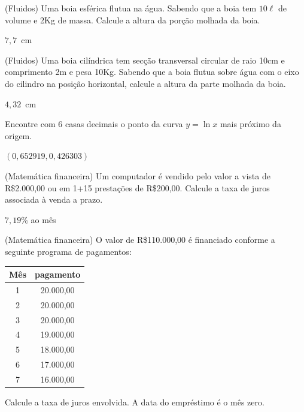 \begin{exer}(Fluidos) \label{boiaesf} Uma boia esférica flutua na água. Sabendo que a boia tem $10\ell$ de volume e 2Kg de massa. Calcule a altura da porção molhada da boia.
\end{exer}
\begin{resp}

$7,7$~cm

\end{resp}

\begin{exer}(Fluidos) \label{boiacil} Uma boia cilíndrica tem secção transversal circular de raio 10cm e comprimento 2m e pesa 10Kg. Sabendo que a boia flutua sobre água com o eixo do cilindro na posição horizontal, calcule a altura da parte molhada da boia.
\end{exer}
\begin{resp}

$4,32$~cm

\end{resp}

\begin{exer} Encontre com 6 casas decimais o ponto da curva $y=\ln x$ mais próximo da origem.
\end{exer}
\begin{resp}

$(0,652919, 0,426303)$

\end{resp}


\begin{exer}(Matemática financeira) Um computador é vendido pelo valor a vista de R\$2.000,00 ou em 1+15 prestações de R\$200,00. Calcule a taxa de juros associada à venda a prazo.
\end{exer}

\begin{resp}

$7,19$\% ao mês

\end{resp}

\begin{exer}(Matemática financeira) O valor de R\$110.000,00 é financiado conforme a seguinte programa de pagamentos:

\begin{tabular}{|c|c|}
\hline
Mês & pagamento\\
\hline
1&20.000,00\\
2&20.000,00\\
3&20.000,00\\
4&19.000,00\\
5&18.000,00\\
6&17.000,00\\
7&16.000,00\\
\hline
\end{tabular}

Calcule a taxa de juros envolvida. A data do empréstimo é o mês zero.
 \end{exer}

